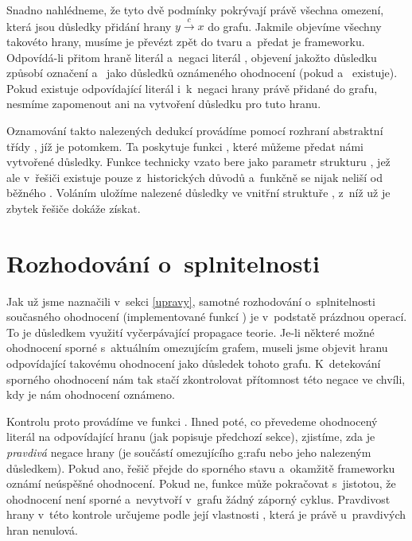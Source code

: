 Snadno nahlédneme, že tyto dvě podmínky pokrývají právě všechna omezení, která jsou důsledky přidání hrany $y \xrightarrow{c} x$ do grafu. Jakmile objevíme všechny takovéto hrany, musíme je převézt zpět do tvaru  a~předat je frameworku. Odpovídá-li přitom hraně  literál  a~negaci  literál , objevení  jakožto důsledku způsobí označení  a~ jako důsledků oznámeného ohodnocení (pokud  a~ existuje). Pokud existuje odpovídající literál  i~k~negaci hrany právě přidané do grafu, nesmíme zapomenout ani na vytvoření důsledku  pro tuto hranu.

Oznamování takto nalezených dedukcí provádíme pomocí rozhraní abstraktní třídy , jíž je  potomkem. Ta poskytuje funkci , které můžeme předat námi vytvořené důsledky. Funkce technicky vzato bere jako parametr strukturu , jež ale v~řešiči existuje pouze z~historických důvodů a~funkčně se nijak neliší od běžného . Voláním  uložíme nalezené důsledky ve vnitřní struktuře , z~níž už je zbytek řešiče dokáže získat.

\section{Rozhodování o~splnitelnosti}\label{rozhod}

Jak už jsme naznačili v~sekci \ref{upravy}, samotné rozhodování o~splnitelnosti současného ohodnocení (implementované funkcí ) je v~podstatě prázdnou operací. To je důsledkem využití vyčerpávající propagace teorie. Je-li některé možné ohodnocení sporné s~aktuálním omezujícím grafem, museli jsme objevit hranu odpovídající takovému ohodnocení jako důsledek tohoto grafu. K~detekování sporného ohodnocení nám tak stačí zkontrolovat přítomnost této negace ve chvíli, kdy je nám ohodnocení oznámeno.

Kontrolu proto provádíme ve funkci . Ihned poté, co převedeme ohodnocený literál na odpovídající hranu (jak popisuje předchozí sekce), zjistíme, zda je \emph{pravdivá} negace hrany (je součástí omezujícího g:rafu nebo jeho nalezeným důsledkem). Pokud ano, řešič přejde do sporného stavu a~okamžitě frameworku oznámí neúspěšné ohodnocení. Pokud ne, funkce může pokračovat s~jistotou, že ohodnocení není sporné a~nevytvoří v~grafu žádný záporný cyklus. Pravdivost hrany v~této kontrole určujeme podle její vlastnosti , která je právě u~pravdivých hran nenulová.

